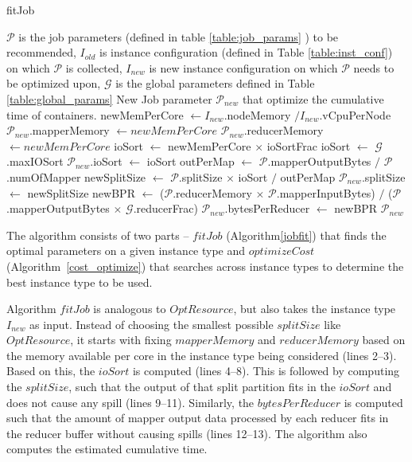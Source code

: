 \begin{algorithm}
	\caption{fitJob}\label{jobfit}
	\begin{algorithmic}[1]
		\footnotesize
		\REQUIRE  $\mathcal{P}$ is the job parameters (defined in table \ref{table:job_params} ) to be recommended, $I_{old}$  is instance configuration (defined in Table \ref{table:inst_conf}) on which $\mathcal{P}$ is collected, $I_{new}$ is new instance configuration on which $\mathcal{P}$ needs to be optimized upon, $\mathcal{G}$ is the global parameters defined in Table \ref{table:global_params}
		\ENSURE New Job parameter $\mathcal{P}_{new}$ that optimize the cumulative time of containers.
		\STATE newMemPerCore $\gets I_{new}$.nodeMemory $/ I_{new}$.vCpuPerNode
		\STATE $\mathcal{P}_{new}$.mapperMemory $\gets newMemPerCore$
		\STATE $\mathcal{P}_{new}$.reducerMemory $\gets newMemPerCore$
		\STATE ioSort $\gets$ newMemPerCore $\times$ ioSortFrac
		\STATE ioSort $\gets$ $\mathcal{G}$.maxIOSort
		\ENDIF
		\STATE $\mathcal{P}_{new}$.ioSort $\gets$ ioSort
		\STATE outPerMap $\gets$ $\mathcal{P}$.mapperOutputBytes $/$ $\mathcal{P}$.numOfMapper
		\STATE newSplitSize $\gets$ $\mathcal{P}$.splitSize $\times$ ioSort $/$ outPerMap
		\STATE $\mathcal{P}_{new}$.splitSize $\gets$ newSplitSize
		\STATE newBPR $\gets$ ($\mathcal{P}$.reducerMemory $\times$ $\mathcal{P}$.mapperInputBytes) $/$ ($\mathcal{P}$.mapperOutputBytes $\times$ $\mathcal{G}$.reducerFrac)  
		\STATE $\mathcal{P}_{new}$.bytesPerReducer $\gets$ newBPR
		\STATE \RETURN $\mathcal{P}_{new}$
	\end{algorithmic}
\end{algorithm}

The algorithm consists of two parts -- $fitJob$ (Algorithm\ref{jobfit}) that finds the optimal parameters on a given instance type and $optimizeCost$ (Algorithm~\ref{cost_optimize}) that searches across instance types to determine the best instance type to be used. 

Algorithm $fitJob$ is analogous to $OptResource$, but also takes the instance type $I_{new}$ as input. Instead of choosing the smallest possible $splitSize$ like $OptResource$, it starts with fixing $mapperMemory$ and $reducerMemory$ based on the memory available per core in the instance type being considered (lines 2--3). Based on this, the $ioSort$ is computed (lines 4--8). This is followed by computing the $splitSize$, such that the output of that split partition fits in the $ioSort$ and does not cause any spill (lines 9--11). Similarly, the $bytesPerReducer$ is computed such that the amount of mapper output data processed by each reducer fits in the reducer buffer without causing spills (lines 12--13). The algorithm also computes the estimated cumulative time.

